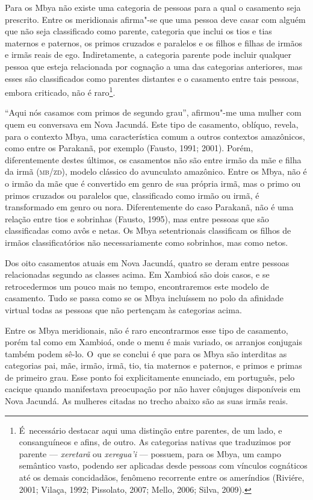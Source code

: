 Para os Mbya não existe uma categoria de pessoas para a qual o casamento
seja prescrito. Entre os meridionais afirma"-se que uma pessoa deve
casar com alguém que não seja classificado como parente, categoria que
inclui os tios e tias maternos e paternos, os primos cruzados e
paralelos e os filhos e filhas de irmãos e irmãs reais de ego.
Indiretamente, a categoria parente pode incluir qualquer pessoa que
esteja relacionada por cognação a uma das categorias anteriores, mas
esses são classificados como parentes distantes e o casamento entre
tais pessoas, embora criticado, não é raro\footnote{É~necessário
destacar aqui uma distinção entre parentes, de um lado, e consanguíneos
e afins, de outro. As categorias nativas que traduzimos por parente ---
\emph{xeretarã} ou \emph{xeregua’i} --- possuem, para os Mbya, um campo semântico
vasto, podendo ser aplicadas desde pessoas com vínculos cognáticos até
os demais concidadãos, fenômeno recorrente entre os ameríndios
(Riviére, 2001; Vilaça, 1992; Pissolato, 2007; Mello, 2006; Silva,
2009).}. 

``Aqui nós casamos com primos de segundo grau'', afirmou"-me uma mulher com
quem eu conversava em Nova Jacundá. Este tipo de casamento, oblíquo,
revela, para o contexto Mbya, uma característica comum a outros
contextos amazônicos, como entre os Parakanã, por exemplo (Fausto,
1991; 2001). Porém, diferentemente destes últimos, os casamentos não
são entre irmão da mãe e filha da irmã (\textsc{mb}/\textsc{zd}), modelo clássico do
avunculato amazônico. Entre os Mbya, não é o irmão da mãe que é
convertido em genro de sua própria irmã, mas o primo ou primos cruzados
ou paralelos que, classificado como irmão ou irmã, é transformado em
genro ou nora. Diferentemente do caso Parakanã, não é uma relação entre
tios e sobrinhas (Fausto, 1995), mas entre pessoas que são
classificadas como avôs e netas. Os Mbya setentrionais classificam os
filhos de irmãos classificatórios não necessariamente como sobrinhos,
mas como netos.

Dos oito casamentos atuais em Nova Jacundá, quatro se deram entre
pessoas relacionadas segundo as classes acima. Em Xambioá são dois
casos, e se retrocedermos um pouco mais no tempo, encontraremos este
modelo de casamento. Tudo se passa como se os Mbya incluíssem no polo
da afinidade virtual todas as pessoas que não pertençam às categorias
acima.

Entre os Mbya meridionais, não é raro encontrarmos esse tipo de
casamento, porém tal como em Xambioá, onde o menu é mais variado, os
arranjos conjugais também podem sê-lo. O~que se conclui é que para os
Mbya são interditas as categorias pai, mãe, irmão, irmã, tio, tia
maternos e paternos, e primos e primas de primeiro grau. Esse ponto foi
explicitamente enunciado, em português, pelo cacique quando manifestava
preocupação por não haver cônjuges disponíveis em Nova Jacundá. As
mulheres citadas no trecho abaixo são as suas irmãs reais.

